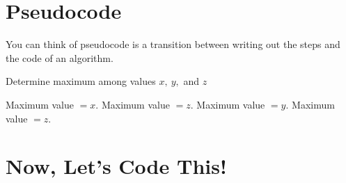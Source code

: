 \documentclass[12pt]{article}
\theoremstyle{definition}
\begin{document}
\section{Pseudocode}

You can think of pseudocode is a transition between writing out the steps and the code of an algorithm.

\begin{algorithm}
\caption{Determine maximum among values $x, \ y,$ and $z$}
\begin{algorithmic} 
		\STATE Maximum value $= x$.
	\ELSE
		\STATE Maximum value $= z$.
	\ENDIF
\ELSE
		\STATE Maximum value $= y$.
	\ELSE
		\STATE Maximum value $= z$.
	\ENDIF
\ENDIF
\end{algorithmic}
\end{algorithm}


\section*{Now, Let's Code This!}
\end{document}
